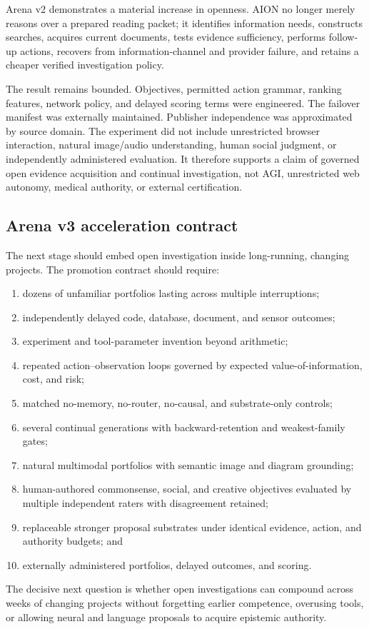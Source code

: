 Arena v2 demonstrates a material increase in openness.  AION no longer merely
reasons over a prepared reading packet; it identifies information needs,
constructs searches, acquires current documents, tests evidence sufficiency,
performs follow-up actions, recovers from information-channel and provider
failure, and retains a cheaper verified investigation policy.

The result remains bounded.  Objectives, permitted action grammar, ranking
features, network policy, and delayed scoring terms were engineered.  The
failover manifest was externally maintained.  Publisher independence was
approximated by source domain.  The experiment did not include unrestricted
browser interaction, natural image/audio understanding, human social judgment,
or independently administered evaluation.  It therefore supports a claim of
governed open evidence acquisition and continual investigation, not AGI,
unrestricted web autonomy, medical authority, or external certification.


\subsection{Arena v3 acceleration contract}
\label{subsec:arena-v3-contract}

The next stage should embed open investigation inside long-running, changing
projects.  The promotion contract should require:
\begin{enumerate}
  \item dozens of unfamiliar portfolios lasting across multiple interruptions;
  \item independently delayed code, database, document, and sensor outcomes;
  \item experiment and tool-parameter invention beyond arithmetic;
  \item repeated action--observation loops governed by expected
        value-of-information, cost, and risk;
  \item matched no-memory, no-router, no-causal, and substrate-only controls;
  \item several continual generations with backward-retention and
        weakest-family gates;
  \item natural multimodal portfolios with semantic image and diagram
        grounding;
  \item human-authored commonsense, social, and creative objectives evaluated
        by multiple independent raters with disagreement retained;
  \item replaceable stronger proposal substrates under identical evidence,
        action, and authority budgets; and
  \item externally administered portfolios, delayed outcomes, and scoring.
\end{enumerate}

The decisive next question is whether open investigations can compound across
weeks of changing projects without forgetting earlier competence, overusing
tools, or allowing neural and language proposals to acquire epistemic
authority.
